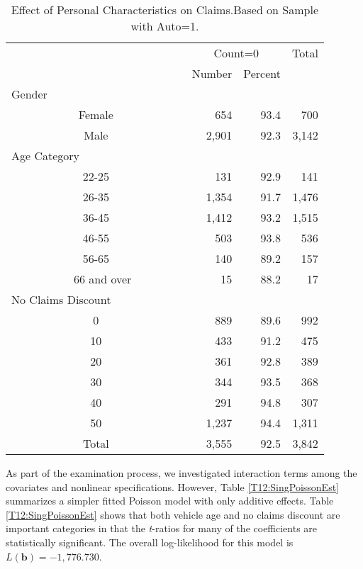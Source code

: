 {\begin{table}[h]\begin{center}
\caption{\label{T12:SingClaimsStats} Effect of Personal
Characteristics on Claims.\newline  Based on Sample with Auto=1.}
\begin{tabular}{crr|r}
\hline
& \multicolumn{2}{c|}{Count=0} & Total \\
& Number & Percent &  \\ \hline
\multicolumn{4}{l}{Gender} \\
Female & \multicolumn{1}{|r}{654} & 93.4 & 700 \\
Male & \multicolumn{1}{|r}{2,901} & 92.3 & 3,142 \\ \hline
\multicolumn{4}{l}{Age Category} \\
22-25 & \multicolumn{1}{|r}{131} & 92.9 & 141 \\
26-35 & \multicolumn{1}{|r}{1,354} & 91.7 & 1,476 \\
36-45 & \multicolumn{1}{|r}{1,412} & 93.2 & 1,515 \\
46-55 & \multicolumn{1}{|r}{503} & 93.8 & 536 \\
56-65 & \multicolumn{1}{|r}{140} & 89.2 & 157 \\
\ \ \ \ \ \ \ \ \ \ \ 66 and over \ \ \ \ \ \ \ \  & \multicolumn{1}{|r}{15}
& 88.2 & 17 \\ \hline
\multicolumn{4}{l}{No Claims Discount} \\
0 & \multicolumn{1}{|r}{889} & 89.6 & 992 \\
10 & \multicolumn{1}{|r}{433} & 91.2 & 475 \\
20 & \multicolumn{1}{|r}{361} & 92.8 & 389 \\
30 & \multicolumn{1}{|r}{344} & 93.5 & 368 \\
40 & \multicolumn{1}{|r}{291} & 94.8 & 307 \\
50 & \multicolumn{1}{|r}{1,237} & 94.4 & 1,311 \\ \hline
Total & \multicolumn{1}{|r}{3,555} & 92.5 & 3,842 \\ \hline
\end{tabular}   \end{center}
\end{table}

As part of the examination process, we investigated interaction
terms among the covariates and nonlinear specifications. However,
Table \ref{T12:SingPoissonEst} summarizes a simpler fitted Poisson
model with only additive effects. Table \ref{T12:SingPoissonEst}
shows that both vehicle age and no claims discount are important
categories in that the \textit{t}-ratios for many of the
coefficients are statistically significant. The overall
log-likelihood for this model is $L( \mathbf{b}) =-1,776.730$.

}
